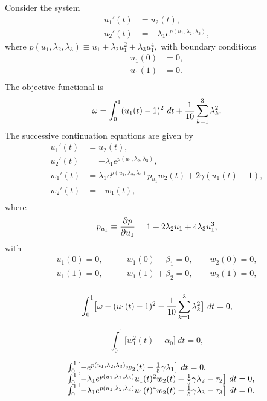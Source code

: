 \documentclass[12pt]{report}
\begin{document}
Consider the system
\begin{equation} \begin{array}{cl}
  u_1'(t) & = u_2(t), \\
  u_2'(t) &=
  -\lambda_1 e^{p(u_1,\lambda_2,\lambda_3)},
\end{array} \end{equation}
where
$ p(u_1,\lambda_2,\lambda_3) \equiv
  u_1 + \lambda_2 u_1^{2} + \lambda_3 u_1^{4},$
with boundary conditions
\begin{equation} \begin{array}{cl}
  u_1(0) &= 0, \\
  u_1(1) &= 0. \\
\end{array} \end{equation}
The objective functional is
$$ \omega = \int_0^{1} (u_1(t)-1)^{2}~ dt
  +  {1\over{10}} \sum_{k=1}^{3} \lambda_{k}^{2}.  $$
The  successive continuation equations are given by
\begin{equation} \begin{array}{cl}
  u_1'(t) &= u_2(t), \\
  u_2'(t) &=
  -\lambda_1 e^{p(u_1,\lambda_2,\lambda_3)}, \\
  w_1'(t) &=
  \lambda_1 e^{p(u_1,\lambda_2,\lambda_3)} p_{u_1} w_2(t)
  + 2 \gamma(u_1(t)-1), \\
  w_2'(t) &= -w_1(t), \\
\end{array} \end{equation}
where
$$ p_{u_1} \equiv
  {{\partial p} \over {\partial u_1}} =
  1 + 2\lambda_2 u_1 + 4\lambda_3 u_1^{3},$$
with 
\begin{equation} \begin{array}{cl}
  u_1(0) = 0,\qquad  &w_1(0) - \beta_1 = 0,\qquad  w_2(0) = 0, \\
  u_1(1) = 0,\qquad  &w_1(1) + \beta_2 = 0,\qquad  w_2(1) = 0, \\\end{array} \end{equation}

$$ \int_0^{1} \bigl[ \omega - (u_1(t)-1)^{2}
  - {1\over{10}} \sum_{k=1}^{3} \lambda_{k}^{2} \bigr]~ dt = 0, $$

$$ \int_0^{1} \bigl[w_1^{2}(t) - \alpha_0 \bigr]~ dt = 0, $$
 
\begin{equation} \begin{array}{cl}
  &\int_0^{1} \bigl[
  -e^{p(u_1,\lambda_2,\lambda_3)} w_2(t)
  - {1\over 5}\gamma \lambda_1
  \bigr]~ dt = 0, \\
  &\int_0^{1} \bigl[
  -\lambda_1 e^{p(u_1,\lambda_2,\lambda_3)} u_1(t)^{2} w_2(t)
  - {1\over 5}\gamma \lambda_2
  - \tau_2  \bigr]~ dt = 0, \\
  &\int_0^{1} \bigl[
  -\lambda_1 e^{p(u_1,\lambda_2,\lambda_3)} u_1(t)^{4} w_2(t)
  - {1\over 5}\gamma \lambda_3
  - \tau_3 \bigr]~ dt = 0. \\\end{array} \end{equation}
\end{document}
